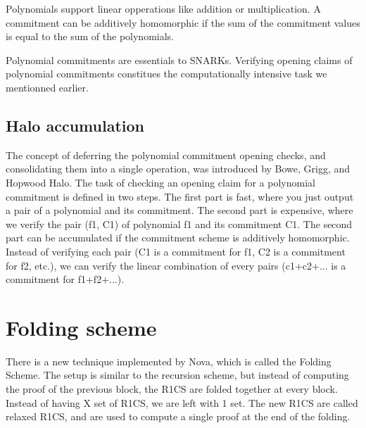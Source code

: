 Polynomials support linear opperations like addition or multiplication. A commitment can be additively homomorphic if the sum of the commitment values
is equal to the sum of the polynomials.

Polynomial commitments are essentials to SNARKs. Verifying opening claims of polynomial commitments constitues the computationally intensive task we mentionned earlier. \cite{VR23}


\subsection{Halo accumulation}

The concept of deferring the polynomial commitment opening checks, and consolidating them into a single operation, was introduced by Bowe, Grigg, and Hopwood Halo.\cite{BGH23}
The task of checking an opening claim for a polynomial commitment is defined in two steps.
The first part is fast, where you just output a pair of a polynomial and its commitment. The second part is expensive, where we verify the pair (f1, C1) of polynomial f1 and its commitment C1.
The second part can be accumulated if the commitment scheme is additively homomorphic. 
Instead of verifying each pair (C1 is a commitment for f1, C2 is a commitment for f2, etc.), we can verify the linear combination of every pairs (c1+c2+... is a commitment for f1+f2+...). \cite{VR23}


\section{Folding scheme} 
There is a new technique implemented by Nova, which is called the Folding Scheme. The setup is similar to the recursion scheme, but instead of computing the proof of the previous block, the R1CS are folded together at every block. Instead of having X set of R1CS, we are left with 1 set. The new R1CS are called relaxed R1CS, and are used to compute a single proof at the end of the folding.

